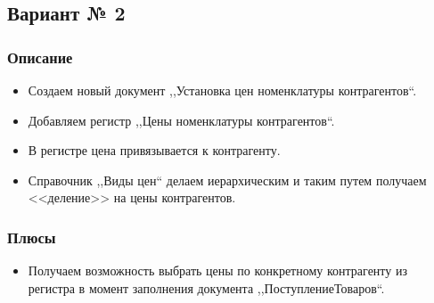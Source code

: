 \subsection{Вариант № 2}

\reversemarginpar




\subsubsection {Описание}
\begin{itemize}	
\item Создаем новый документ ,,Установка цен номенклатуры контрагентов``.
\item Добавляем регистр ,,Цены номенклатуры контрагентов``.
\item В регистре цена привязывается к контрагенту.
\item Справочник ,,Виды цен`` делаем иерархическим и таким путем получаем <<деление>> на цены контрагентов.
\end{itemize}
\subsubsection{Плюсы}
\begin{itemize}	
\item Получаем возможность выбрать цены по конкретному контрагенту из регистра в момент заполнения документа ,,ПоступлениеТоваров``.
\end{itemize}
